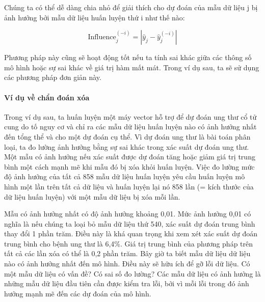 Chúng ta có thể dễ dàng chia nhỏ để giải thích cho dự đoán của mẫu dữ liệu j bị ảnh hưởng bởi mẫu dữ liệu huấn luyện thứ i như thế nào:

$$\text{Influence}_{j}^{(-i)}=\left|\hat{y}_j-\hat{y}_{j}^{(-i)}\right|$$

Phương pháp này cũng sẽ hoạt động tốt nếu ta tính sai khác giữa các thông số mô hình hoặc sự sai khác về giá trị hàm mất mát. Trong ví dụ sau, ta sẽ sử dụng các phương pháp đơn giản này.

\paragraph{Ví dụ về chẩn đoán xóa}

Trong ví dụ sau, ta huấn luyện một máy vector hỗ trợ để dự đoán ung thư cổ tử cung do tố nguy cơ và chỉ ra các mẫu dữ liệu huấn luyện nào có ảnh hưởng nhất đến tổng thể và cho một dự đoán cụ thể. Vì dự đoán ung thư là bài toán phân loại, ta đo lường ảnh hưởng bằng sự sai khác trong xác suất dự đoán ung thư. Một mẫu có ảnh hưởng nếu xác suất được dự đoán tăng hoặc giảm giá trị trung bình một cách mạnh mẽ khi mẫu đó bị xóa khỏi huấn luyện. Việc đo lường mức độ ảnh hưởng của tất cả 858 mẫu dữ liệu huấn luyện yêu cầu huấn luyện mô hình một lần trên tất cả dữ liệu và huấn luyện lại nó 858 lần (= kích thước của dữ liệu huấn luyện) với một mẫu dữ liệu bị xóa mỗi lần.

Mẫu có ảnh hưởng nhất có độ ảnh hưởng khoảng 0,01. Mức ảnh hưởng 0,01 có nghĩa là nếu chúng ta loại bỏ mẫu dữ liệu thứ 540, xác suất dự đoán trung bình thay đổi 1 phần trăm. Điều này là khá quan trọng khi xem xét xác suất dự đoán trung bình cho bệnh ung thư là 6,4\%. Giá trị trung bình của phương pháp trên tất cả các lần xóa có thể là 0,2 phần trăm. Bây giờ ta biết mẫu dữ liệu dữ liệu nào có ảnh hưởng nhất đến mô hình. Điều này sẽ hữu ích để gỡ lỗi dữ liệu. Có một mẫu dữ liệu có vấn đề? Có sai số đo lường? Các mẫu dữ liệu có ảnh hưởng là những mẫu dữ liệu đầu tiên cần được kiểm tra lỗi, bởi vì mỗi lỗi trong đó ảnh hưởng mạnh mẽ đến các dự đoán của mô hình.


